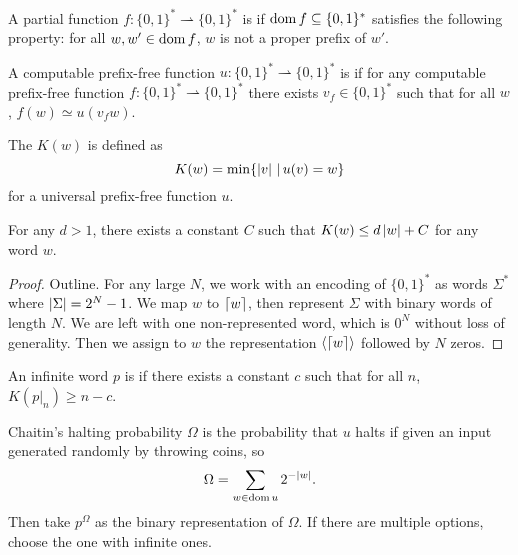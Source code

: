 \begin{definition}
  A partial function $f: \{0,1\}^* \rightharpoonup \{0,1\}^*$ is
   if $\operatorname{dom} f \subseteq \{0,1\}^*$ satisfies the following
  property:
  for all $w, w' \in \operatorname{dom} f$, $w$ is not a proper prefix of $w'$.
\end{definition}

\begin{definition}
  A computable prefix-free function $u: \{0,1\}^* \rightharpoonup \{0,1\}^*$ is
   if for any computable prefix-free function $f: \{0,1\}^*
  \rightharpoonup \{0,1\}^*$ there exists $v_f \in \{0,1\}^*$ such that for all
  $w$, $f(w) \simeq u(v_f w)$.
\end{definition}

\begin{definition}
  The  $K(w)$ is defined as
  \[
	K(w) = \min \{ \left| v \right| \,|\, u(v) = w \}
  \]
  for a universal prefix-free function $u$.
\end{definition}

\begin{proposition}
  For any $d > 1$, there exists a constant $C$ such that $K(w) \le d \left| w \right| +
  C$ for any word $w$.
\end{proposition}

\begin{proof}
  Outline.
  For any large $N$, we work with an encoding of $\{0,1\}^*$ as words $\Sigma^*$
  where $\left| \Sigma \right| = 2^N -1$.
  We map $w$ to $\lceil w \rceil$, then represent $\Sigma$ with binary words of length
  $N$.
  We are left with one non-represented word, which is $0^N$ without loss of
  generality.
  Then we assign to $w$ the representation $\left< \lceil w \rceil \right>$ followed by $N$
  zeros.
\end{proof}

\begin{definition}
  An infinite word $p$ is  if there exists a
  constant $c$ such that for all $n$, $K(\left. p \right|_n) \ge n - c$.
\end{definition}

\begin{definition}
  Chaitin's halting probability $\Omega$ is the probability that $u$ halts if
  given an input generated randomly by throwing coins, so
  \[
	\Omega = \sum_{w \in \operatorname{dom} u} 2^{-\left| w \right|}.
  \]
  Then take $p^\Omega$ as the binary representation of $\Omega$.
  If there are multiple options, choose the one with infinite ones.
\end{definition}

